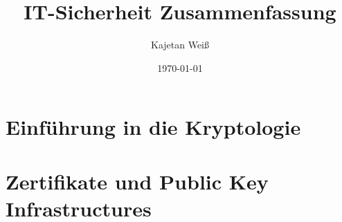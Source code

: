 %





\title{IT-Sicherheit Zusammenfassung}
\author{Kajetan Weiß}
\date{\today}
\maketitle



\tableofcontents



\part{Einführung in die Kryptologie}









\part{Zertifikate und Public Key Infrastructures}



%
